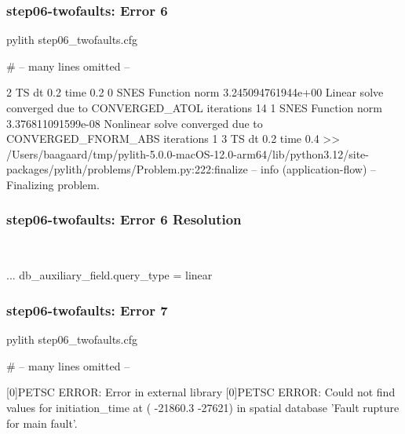 \documentclass[aspectratio=169]{beamer}
\begin{document}
\begin{frame}[fragile]
  \frametitle{{\ttfamily step06-twofaults}: Error 6}

\begin{pyrejournal}
pylith step06_twofaults.cfg

# -- many lines omitted --

2 TS dt 0.2 time 0.2
    0 SNES Function norm 3.245094761944e+00
      Linear solve converged due to CONVERGED_ATOL iterations 14
    1 SNES Function norm 3.376811091599e-08
    Nonlinear solve converged due to CONVERGED_FNORM_ABS iterations 1
3 TS dt 0.2 time 0.4
 >> /Users/baagaard/tmp/pylith-5.0.0-macOS-12.0-arm64/lib/python3.12/site-packages/pylith/problems/Problem.py:222:finalize
 -- info (application-flow)
 -- Finalizing problem.
\end{pyrejournal}

\end{frame}


\begin{frame}[t,fragile]
  \frametitle{{\ttfamily step06-twofaults}: Error 6 Resolution}

  \tserror\par

  \pause\\[1pt]

  \begin{cfgcode}
    ...
    db_auxiliary_field.query_type = linear
  \end{cfgcode}

\end{frame}


\begin{frame}[fragile]
  \frametitle{{\ttfamily step06-twofaults}: Error 7}

\begin{pyrejournal}
pylith step06_twofaults.cfg

# -- many lines omitted --

[0]PETSC ERROR: Error in external library
[0]PETSC ERROR: Could not find values for initiation_time at (  -21860.3  -27621) in spatial database 'Fault rupture for main fault'.
\end{pyrejournal}

\end{frame}
\end{document}
